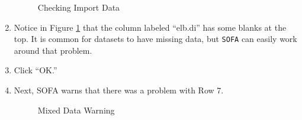 \begin{enumerate}
  \begin{figure}[H]
    \begin{center}
      \caption{Checking Import Data}
      \label{int:checking_import_data}
    \end{center}
  \end{figure}
  
  \item Notice in Figure \ref{int:checking_import_data} that the column labeled ``elb.di'' has some blanks at the top. It is common for datasets to have missing data, but \texttt{SOFA} can easily work around that problem. 
  \item Click ``OK.''
  \item Next, SOFA warns that there was a problem with Row $ 7 $.
  
  \begin{figure}[H]
    \begin{center}
      \caption{Mixed Data Warning}
    \end{center}
  \end{figure}
  

\end{enumerate}

